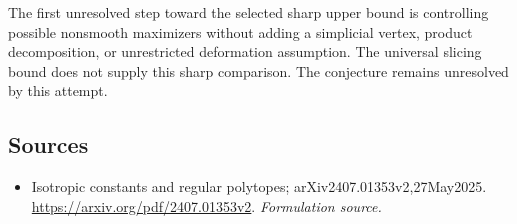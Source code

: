 \documentclass[11pt]{article}
\begin{document}
The first unresolved step toward the selected sharp upper bound is
controlling possible nonsmooth maximizers without adding a simplicial
vertex, product decomposition, or unrestricted deformation assumption.
The universal slicing bound does not supply this sharp comparison.
The conjecture remains unresolved by this attempt.
\subsection{Sources}
\begin{itemize}
\item[S1]Isotropic constants and regular polytopes; arXiv2407.01353v2,27May2025.
\url{https://arxiv.org/pdf/2407.01353v2}.
\textit{Formulation source.}
\end{itemize}
\end{document}
